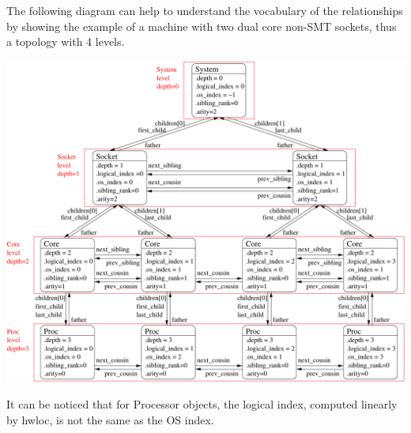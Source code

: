The following diagram can help to understand the vocabulary of the relationships by showing the example of a machine with two dual core non-SMT sockets, thus a topology with 4 levels.

 \begin{ImageNoCaption}\mbox{\includegraphics[width=\textwidth]{diagram}}
\end{ImageNoCaption}


It can be noticed that for Processor objects, the logical index, computed linearly by hwloc, is not the same as the OS index. 
